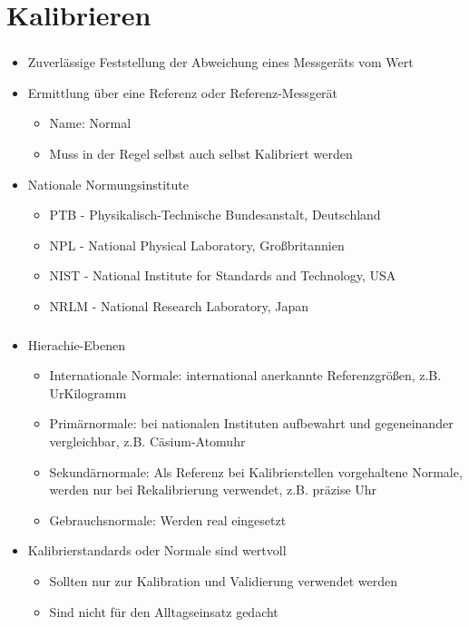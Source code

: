 \section{Kalibrieren}
\begin{frame}
    \frametitle{\insertsection}
    \begin{itemize}
        \item Zuverlässige Feststellung der Abweichung eines Messgeräts vom Wert
        \item Ermittlung über eine Referenz oder Referenz-Messgerät
        \begin{itemize}
            \item Name: Normal
            \item Muss in der Regel selbst auch selbst Kalibriert werden
        \end{itemize}
        \item Nationale Normungsinstitute
        \begin{itemize}
            \item PTB - Physikalisch-Technische Bundesanstalt, Deutschland
            \item NPL - National Physical Laboratory, Großbritannien
            \item NIST - National Institute for Standards and Technology, USA
            \item NRLM - National Research Laboratory, Japan
        \end{itemize}
    \end{itemize}
\end{frame}

\begin{frame}
    \frametitle{\insertsection}
    \begin{itemize}
        \item Hierachie-Ebenen
        \begin{itemize}
            \item Internationale Normale: international anerkannte Referenzgrößen, z.B. UrKilogramm
            \item Primärnormale: bei nationalen Instituten aufbewahrt und gegeneinander vergleichbar, z.B. Cäsium-Atomuhr
            \item Sekundärnormale: Als Referenz bei Kalibrierstellen vorgehaltene Normale, werden nur bei Rekalibrierung verwendet, z.B. präzise Uhr
            \item Gebrauchsnormale: Werden real eingesetzt
        \end{itemize}
        \item Kalibrierstandards oder Normale sind wertvoll
        \begin{itemize}
            \item Sollten nur zur Kalibration und Validierung verwendet werden
            \item Sind nicht für den Alltagseinsatz gedacht
        \end{itemize}
    \end{itemize}
\end{frame}

